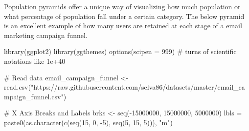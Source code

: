 \documentclass[a4paper]{article}
\newenvironment{Shaded}{}{}
\newcommand{\KeywordTok}[1]{\textcolor[rgb]{0.00,0.00,1.00}{#1}}
\newcommand{\DataTypeTok}[1]{#1}
\newcommand{\DecValTok}[1]{#1}
\newcommand{\StringTok}[1]{\textcolor[rgb]{0.00,0.50,0.50}{#1}}
\newcommand{\CommentTok}[1]{\textcolor[rgb]{0.00,0.50,0.00}{#1}}
\newcommand{\OperatorTok}[1]{#1}
\newcommand{\NormalTok}[1]{#1}
\begin{document}
Population pyramids offer a unique way of visualizing how much
population or what percentage of population fall under a certain
category. The below pyramid is an excellent example of how many users
are retained at each stage of a email marketing campaign funnel.

\begin{Shaded}
\begin{Highlighting}[]
\KeywordTok{library}\NormalTok{(ggplot2)}
\KeywordTok{library}\NormalTok{(ggthemes)}
\KeywordTok{options}\NormalTok{(}\DataTypeTok{scipen =} \DecValTok{999}\NormalTok{)  }\CommentTok{# turns of scientific notations like 1e+40}

\CommentTok{# Read data}
\NormalTok{email_campaign_funnel <-}
\StringTok{  }\KeywordTok{read.csv}\NormalTok{(}\StringTok{"https://raw.githubusercontent.com/selva86/datasets/master/email_campaign_funnel.csv"}\NormalTok{)}

\CommentTok{# X Axis Breaks and Labels }
\NormalTok{brks <-}\StringTok{ }\KeywordTok{seq}\NormalTok{(}\OperatorTok{-}\DecValTok{15000000}\NormalTok{, }\DecValTok{15000000}\NormalTok{, }\DecValTok{5000000}\NormalTok{)}
\NormalTok{lbls =}\StringTok{ }\KeywordTok{paste0}\NormalTok{(}\KeywordTok{as.character}\NormalTok{(}\KeywordTok{c}\NormalTok{(}\KeywordTok{seq}\NormalTok{(}\DecValTok{15}\NormalTok{, }\DecValTok{0}\NormalTok{, }\OperatorTok{-}\DecValTok{5}\NormalTok{), }\KeywordTok{seq}\NormalTok{(}\DecValTok{5}\NormalTok{, }\DecValTok{15}\NormalTok{, }\DecValTok{5}\NormalTok{))), }\StringTok{"m"}\NormalTok{)}


\end{Highlighting}
\end{Shaded}
\end{document}
